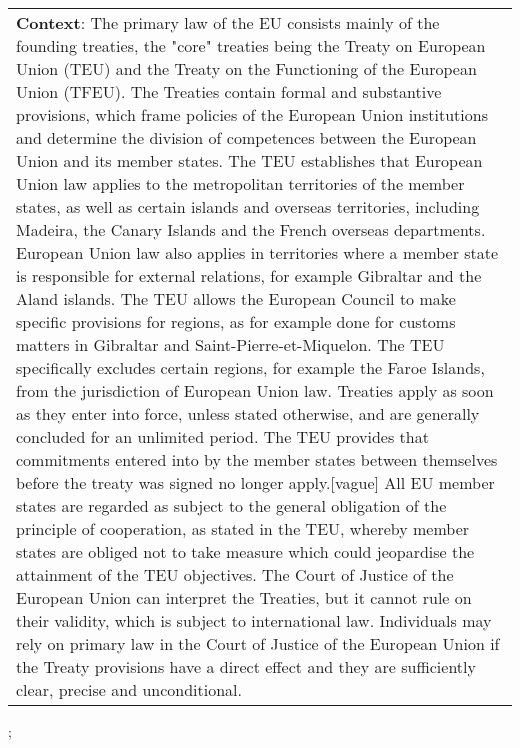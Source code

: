 \begin{figure*}[ht]
{\begin{tabular}{p{}}
            \textbf{Context}: The primary law of the EU consists mainly of the founding treaties, the "core" treaties being the Treaty on European Union (TEU) and the Treaty on the Functioning of the European Union (TFEU). The Treaties contain formal and substantive provisions, which frame policies of the European Union institutions and determine the division of competences between the European Union and its member states. The TEU establishes that European Union law applies to the metropolitan territories of the member states, as well as certain islands and overseas territories, including Madeira, the Canary Islands and the French overseas departments. European Union law also applies in territories where a member state is responsible for external relations, for example Gibraltar and the Aland islands. The TEU allows the European Council to make specific provisions for regions, as for example done for customs matters in Gibraltar and Saint-Pierre-et-Miquelon. The TEU specifically excludes certain regions, for example the Faroe Islands, from the jurisdiction of European Union law. Treaties apply as soon as they enter into force, unless stated otherwise, and are generally concluded for an unlimited period. The TEU provides that commitments entered into by the member states between themselves before the treaty was signed no longer apply.[vague] All EU member states are regarded as subject to the general obligation of the principle of cooperation, as stated in the TEU, whereby member states are obliged not to take measure which could jeopardise the attainment of the TEU objectives. The Court of Justice of the European Union can interpret the Treaties, but it cannot rule on their validity, which is subject to international law. Individuals may rely on primary law in the Court of Justice of the European Union if the Treaty provisions have a direct effect and they are sufficiently clear, precise and unconditional. \\
        \end{tabular}
    };
    \label{fig:ex-5725ca4389a1e219009abeb6}
\end{figure*}

